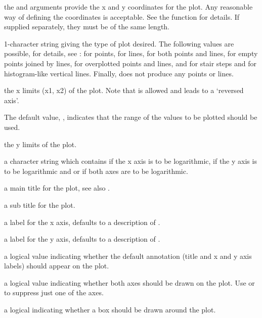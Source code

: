 \begin{Arguments}
\begin{ldescription}
\item[\code{x, y}] the  and  arguments provide the x and y
coordinates for the plot.  Any reasonable way of defining the
coordinates is acceptable.  See the function 
for details.  If supplied separately, they must be of the same length.
\item[\code{type}] 1-character string giving the type of plot desired.  The
following values are possible, for details, see :
 for points,  for lines,
 for both points and lines,
 for empty points joined by lines,    
 for overplotted points and lines,
 and  for stair steps and
 for histogram-like vertical lines.  Finally,
 does not produce any points or lines.
\item[\code{xlim}] the x limits (x1, x2) of the plot.  Note that 
is allowed and leads to a `reversed axis'.

The default value, , indicates that the range of the
 values to be plotted should be used.
\item[\code{ylim}] the y limits of the plot.
\item[\code{log}] a character string which contains  if the x axis
is to be logarithmic,  if the y axis is to be logarithmic
and  or  if both axes are to be logarithmic.

\item[\code{main}] a main title for the plot, see also .
\item[\code{sub}] a sub title for the plot.
\item[\code{xlab}] a label for the x axis, defaults to a description of .
\item[\code{ylab}] a label for the y axis, defaults to a description of .

\item[\code{ann}] a logical value indicating whether the default annotation
(title and x and y axis labels) should appear on the plot.
\item[\code{axes}] a logical value indicating whether both axes should be drawn on
the plot.  Use   or 
to suppress just one of the axes.
\item[\code{frame.plot}] a logical indicating whether a box should be drawn
around the plot.


\end{ldescription}
\end{Arguments}
